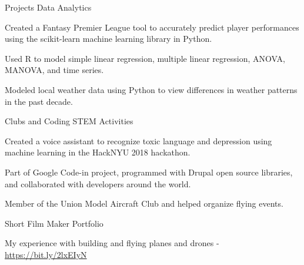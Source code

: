 \begin{cventries}
  \cventry
    {Projects}
    {Data Analytics}
    {}
    {}
    {
      \begin{cvitems}
        \item {Created a Fantasy Premier League tool to accurately predict player performances using the scikit-learn machine learning library in Python.}
        \item {Used R to model simple linear regression, multiple linear regression, ANOVA, MANOVA, and time series.}
        \item {Modeled local weather data using Python to view differences in weather patterns in the past decade.}
      \end{cvitems}
    }
  \cventry
    {Clubs and Coding}
    {STEM Activities}
    {}
    {}
    {
      \begin{cvitems}
        \item {Created a voice assistant to recognize toxic language and depression using machine learning in the HackNYU 2018 hackathon.}
        \item {Part of Google Code-in project, programmed with Drupal open source libraries, and collaborated with developers around the world.}
        \item {Member of the Union Model Aircraft Club and helped organize flying events.}
      \end{cvitems}
    }
  \cventry
    {Short Film}
    {Maker Portfolio}
    {}
    {}
    {
      \begin{cvitems}
        \item {My experience with building and flying planes and drones - \href{https://bit.ly/2lxEIyN}{https://bit.ly/2lxEIyN}}
      \end{cvitems}
    }
\end{cventries}
